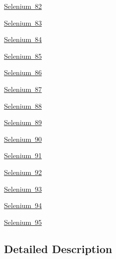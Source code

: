 \begin{DoxyCompactItemize}
\item 
\mbox{\hyperlink{group___isotope_const-_selenium-_se82}{Selenium 82}}
\item 
\mbox{\hyperlink{group___isotope_const-_selenium-_se83}{Selenium 83}}
\item 
\mbox{\hyperlink{group___isotope_const-_selenium-_se84}{Selenium 84}}
\item 
\mbox{\hyperlink{group___isotope_const-_selenium-_se85}{Selenium 85}}
\item 
\mbox{\hyperlink{group___isotope_const-_selenium-_se86}{Selenium 86}}
\item 
\mbox{\hyperlink{group___isotope_const-_selenium-_se87}{Selenium 87}}
\item 
\mbox{\hyperlink{group___isotope_const-_selenium-_se88}{Selenium 88}}
\item 
\mbox{\hyperlink{group___isotope_const-_selenium-_se89}{Selenium 89}}
\item 
\mbox{\hyperlink{group___isotope_const-_selenium-_se90}{Selenium 90}}
\item 
\mbox{\hyperlink{group___isotope_const-_selenium-_se91}{Selenium 91}}
\item 
\mbox{\hyperlink{group___isotope_const-_selenium-_se92}{Selenium 92}}
\item 
\mbox{\hyperlink{group___isotope_const-_selenium-_se93}{Selenium 93}}
\item 
\mbox{\hyperlink{group___isotope_const-_selenium-_se94}{Selenium 94}}
\item 
\mbox{\hyperlink{group___isotope_const-_selenium-_se95}{Selenium 95}}
\end{DoxyCompactItemize}


\subsection{Detailed Description}
